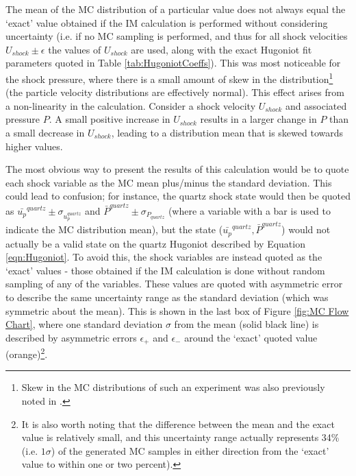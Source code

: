 The mean of the MC distribution of a particular value does not always equal the `exact' value obtained if the IM calculation is performed without considering uncertainty (i.e. if no MC sampling is performed, and thus for all shock velocities $U_{shock} \pm \epsilon$ the values of $U_{shock}$ are used, along with the exact Hugoniot fit parameters quoted in Table \ref{tab:HugoniotCoeffs}). This was most noticeable for the shock pressure, where there is a small amount of skew in the distribution\footnote{Skew in the MC distributions of such an experiment was also previously noted in \cite{Root2013}.} (the particle velocity distributions are effectively normal). This effect arises from a non-linearity in the calculation. Consider a shock velocity $U_{shock}$ and associated pressure $P$. A small positive increase in $U_{shock}$ results in a larger change in $P$ than a small decrease in $U_{shock}$, leading to a distribution mean that is skewed towards higher values.

The most obvious way to present the results of this calculation would be to quote each shock variable as the MC mean plus/minus the standard deviation. This could lead to confusion; for instance, the quartz shock state would then be quoted as $\bar{u_p}^{quartz} \pm \sigma_{u_p^{quartz}}$ and $\bar{P}^{quartz} \pm \sigma_{P_{quartz}}$ (where a variable with a bar is used to indicate the MC distribution mean), but the state ($\bar{u_p}^{quartz}, \bar{P}^{quartz}$) would not actually be a valid state on the quartz Hugoniot described by Equation \ref{eqn:Hugoniot}. To avoid this, the shock variables are instead quoted as the `exact' values - those obtained if the IM calculation is done without random sampling of any of the variables. These values are quoted with asymmetric error to describe the same uncertainty range as the standard deviation (which was symmetric about the mean). This is shown in the last box of Figure \ref{fig:MC Flow Chart}, where one standard deviation $\sigma$ from the mean (solid black line) is described by asymmetric errors $\epsilon_+$ and $\epsilon_-$ around the `exact' quoted value (orange)\footnote{It is also worth noting that the difference between the mean and the exact value is relatively small, and this uncertainty range actually represents 34\% (i.e. $1 \sigma$) of the generated MC samples in either direction from the `exact' value to within one or two percent).}.

